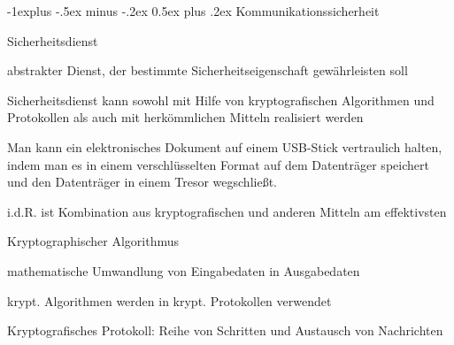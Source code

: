 \documentclass[a4paper]{article}
\makeatletter
\renewcommand{\subsection}{\@startsection{subsection}{2}{0mm}%
 {-1explus -.5ex minus -.2ex}%
 {0.5ex plus .2ex}%
 {\normalfont\normalsize\bfseries}}
\makeatother
\begin{document}
\begin{multicols}{3}
      \subsection{Kommunikationssicherheit}
      \begin{itemize*}
            \item Sicherheitsdienst
            \begin{itemize*}
                  \item abstrakter Dienst, der bestimmte Sicherheitseigenschaft gewährleisten soll
                  \item Sicherheitsdienst kann sowohl mit Hilfe von kryptografischen Algorithmen und Protokollen als auch mit herkömmlichen Mitteln realisiert werden
                  \begin{itemize*}
                        \item Man kann ein elektronisches Dokument auf einem USB-Stick vertraulich halten, indem man es in einem verschlüsselten Format auf dem Datenträger speichert und den Datenträger in einem Tresor wegschließt.
                        \item i.d.R. ist Kombination aus kryptografischen und anderen Mitteln am effektivsten
                  \end{itemize*}
            \end{itemize*}
            \item Kryptographischer Algorithmus
            \begin{itemize*}
                  \item mathematische Umwandlung von Eingabedaten in Ausgabedaten
                  \item krypt. Algorithmen werden in krypt. Protokollen verwendet
            \end{itemize*}
            \item Kryptografisches Protokoll: Reihe von Schritten und Austausch von Nachrichten %
      \end{itemize*}


\end{multicols}
\end{document}
